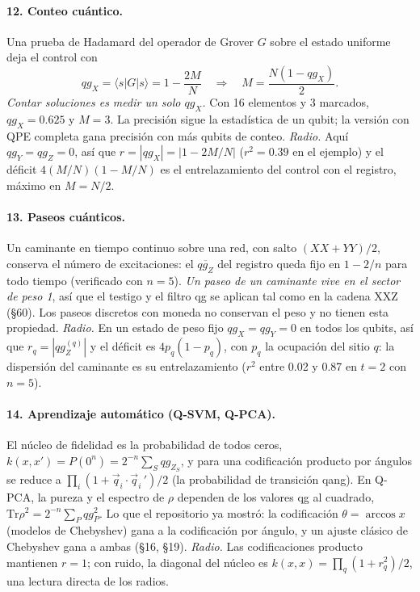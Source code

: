 \documentclass[11pt]{article}
\newcommand{\q}[1]{qg_{#1}}
\newcommand{\qZ}{qg_Z}
\newcommand{\qX}{qg_X}
\newcommand{\qY}{qg_Y}
\begin{document}
\paragraph{12. Conteo cuántico.} Una prueba de Hadamard del operador de Grover $G$ sobre el estado uniforme
deja el control con
\begin{equation}\label{eq:conteo}
\qX=\langle s|G|s\rangle=1-\frac{2M}{N}\quad\Longrightarrow\quad M=\frac{N(1-\qX)}{2}.
\end{equation}
\emph{Contar soluciones es medir un solo $\qX$.} Con 16 elementos y 3 marcados, $\qX=0.625$ y $M=3$. La
precisión sigue la estadística de un qubit; la versión con QPE completa gana precisión con más qubits de
conteo. \emph{Radio.} Aquí $\qY=\qZ=0$, así que $r=|\qX|=|1-2M/N|$ ($r^2=0.39$ en el ejemplo) y el déficit
$4(M/N)(1-M/N)$ es el entrelazamiento del control con el registro, máximo en $M=N/2$.

\paragraph{13. Paseos cuánticos.} Un caminante en tiempo continuo sobre una red, con salto
$(XX+YY)/2$, conserva el número de excitaciones: el $\overline{\qZ}$ del registro queda fijo en $1-2/n$
para todo tiempo (verificado con $n=5$). \emph{Un paseo de un caminante vive en el sector de peso 1}, así que
el testigo y el filtro qg se aplican tal como en la cadena XXZ (§60). Los paseos discretos con moneda no
conservan el peso y no tienen esta propiedad. \emph{Radio.} En un estado de peso fijo $\qX=\qY=0$ en todos los qubits,
así que $r_q=|\qZ^{(q)}|$ y el déficit es $4p_q(1-p_q)$, con $p_q$ la ocupación del sitio $q$: la dispersión del
caminante es su entrelazamiento ($r^2$ entre 0.02 y 0.87 en $t=2$ con $n=5$).

\paragraph{14. Aprendizaje automático (Q-SVM, Q-PCA).} El núcleo de fidelidad es la probabilidad de todos
ceros, $k(x,x')=P(0^n)=2^{-n}\sum_S\q{Z_S}$, y para una codificación producto por ángulos se reduce a
$\prod_i(1+\vec q_i\cdot\vec q_i\,')/2$ (la probabilidad de transición qang). En Q-PCA, la pureza y el
espectro de $\rho$ dependen de los valores qg al cuadrado, $\mathrm{Tr}\rho^2=2^{-n}\sum_P\q{P}^2$. Lo que el
repositorio ya mostró: la codificación $\theta=\arccos x$ (modelos de Chebyshev) gana a la codificación por
ángulo, y un ajuste clásico de Chebyshev gana a ambas (§16, §19). \emph{Radio.} Las codificaciones producto
mantienen $r=1$; con ruido, la diagonal del núcleo es $k(x,x)=\prod_q(1+r_q^2)/2$, una lectura directa de los radios.
\end{document}
